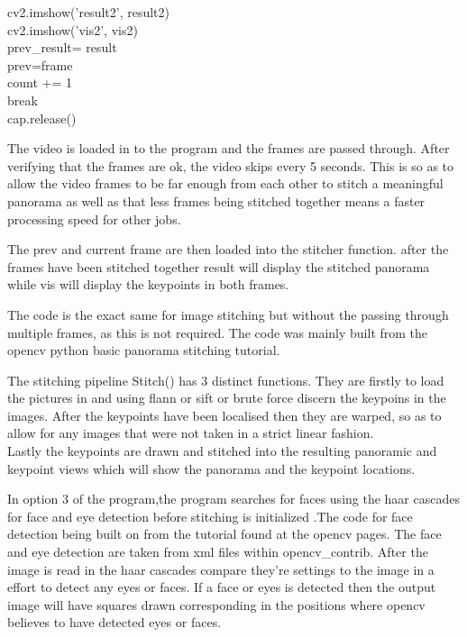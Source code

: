 \documentclass{article}
\begin{document}
cv2.imshow('result2', result2)\\
cv2.imshow('vis2', vis2)\\
prev\_result= result\\


prev=frame\\

count += 1\\

break\\
cap.release()



The video is loaded in to the program and the frames are passed through. After verifying that the frames are ok, the video skips every 5 seconds. This is so as to allow the video frames to be far enough from each other to stitch a meaningful panorama as well as that less frames being stitched together means a faster processing speed for other jobs.

The prev and current frame are then loaded into the stitcher function. after the frames have been stitched together result will display the stitched panorama while vis will display the keypoints in both frames. 

The code is the exact same for image stitching but without the passing through multiple frames, as this is not required.
The code was mainly built from the opencv python basic panorama stitching tutorial.  \cite{ref:pc1}

The stitching pipeline Stitch() has 3 distinct functions. They are firstly to load the pictures in  and using flann or sift or brute force discern the keypoins in the images. 
After the keypoints have been localised then they are warped, so as to allow for any images that were not taken in a strict linear fashion. \\
Lastly the keypoints are drawn and stitched into the resulting panoramic and keypoint views which will show the panorama and the keypoint locations.



In option 3 of the program,the program searches for faces using the haar cascades for face and eye detection before stitching is initialized .The code for face detection being built on from the tutorial found at the opencv pages.\cite{ref:fd}
The face and eye detection are taken from xml files within opencv\_contrib. After the image is read in the haar cascades compare they're settings to the image in a effort to detect any eyes or faces. If a face or eyes is detected then the output image will have squares drawn corresponding in the positions where opencv believes to have detected eyes or faces.
\end{document}
